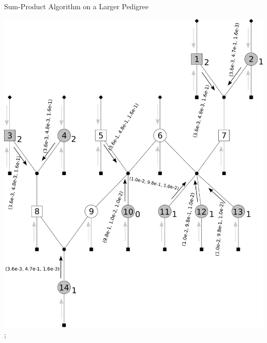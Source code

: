 \documentclass[letter,graphicx]{beamer}
\begin{document}
\begin{frame}{Sum-Product Algorithm on a Larger Pedigree} 
\begin{center} 
\includegraphics[height = 0.8\textheight]{./images/mg-example-step2.pdf}; 
\end{center}
\end{frame}
\end{document}
